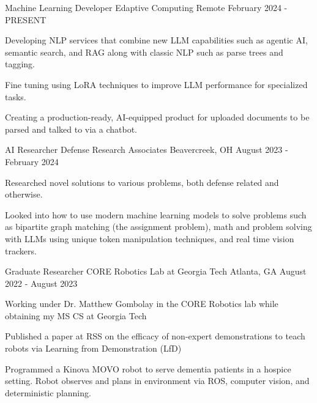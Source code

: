 
\begin{cventries}

\cventry
    {Machine Learning Developer} %
    {Edaptive Computing} %
    {Remote} %
    {February 2024 - PRESENT} %
    {
      \begin{cvitems} %
        \item {Developing NLP services that combine new LLM capabilities such as agentic AI, semantic search, and RAG along with classic NLP such as parse trees and tagging.}
        \item {Fine tuning using LoRA techniques to improve LLM performance for specialized tasks.}
        \item {Creating a production-ready, AI-equipped product for uploaded documents to be parsed and talked to via a chatbot.}
      \end{cvitems}
    }
    
\cventry
    {AI Researcher} %
    {Defense Research Associates} %
    {Beavercreek, OH} %
    {August 2023 - February 2024} %
    {
      \begin{cvitems} %
        \item {Researched novel solutions to various problems, both defense related and otherwise.}
        \item {Looked into how to use modern machine learning models to solve problems such as bipartite graph matching (the assignment problem), math and problem solving with LLMs using unique token manipulation techniques, and real time vision trackers.}
      \end{cvitems}
    }

\cventry
    {Graduate Researcher} %
    {CORE Robotics Lab at Georgia Tech} %
    {Atlanta, GA} %
    {August 2022 - August 2023} %
    {
      \begin{cvitems} %
        \item {Working under Dr. Matthew Gombolay in the CORE Robotics lab while obtaining my MS CS at Georgia Tech}
        \item {Published a paper at RSS on the efficacy of non-expert demonstrations to teach robots via Learning from Demonstration (LfD)}
        \item {Programmed a Kinova MOVO robot to serve dementia patients in a hospice setting. Robot observes and plans in environment via ROS, computer vision, and deterministic planning.}
      \end{cvitems}
    }


\end{cventries}
